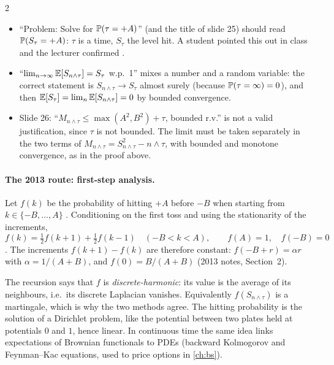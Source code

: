 \begin{paracol}{2}
\begin{coursenote}
\begin{itemize}
  \item ``Problem: Solve for $\mathbb{P}(\tau=+A)$'' (and the title of slide 25) should read $\mathbb{P}(S_\tau=+A)$: $\tau$ is a
        time, $S_\tau$ the level hit. A student pointed this out in class and the lecturer confirmed .
  \item ``$\lim_{n\to\infty}\mathbb{E}[S_{n\wedge\tau}]=S_\tau$ w.p.~1'' mixes a number and a random variable: the correct
        statement is $S_{n\wedge\tau}\to S_\tau$ almost surely (because $\mathbb{P}(\tau=\infty)=0$), and then
        $\mathbb{E}[S_\tau]=\lim_n\mathbb{E}[S_{n\wedge\tau}]=0$ by bounded convergence.
  \item Slide 26: ``$M_{n\wedge\tau}\le\max(A^2,B^2)+\tau$, bounded r.v.'' is not a valid justification, since $\tau$ is not
        bounded. The limit must be taken separately in the two terms of $M_{n\wedge\tau}=S^2_{n\wedge\tau}-n\wedge\tau$,
        with bounded and monotone convergence, as in the proof above.
\end{itemize}
\end{coursenote}

\paragraph{The 2013 route: first-step analysis.} Let $f(k)$ be the probability of hitting $+A$ before $-B$ when
starting from $k\in\{-B,\dots,A\}$ . Conditioning on the first toss and using the stationarity of
the increments,
\[
  f(k)=\tfrac12f(k+1)+\tfrac12f(k-1)\quad(-B<k<A),\qquad f(A)=1,\quad f(-B)=0
\]
. The increments $f(k+1)-f(k)$ are therefore constant: $f(-B+r)=\alpha r$ with
$\alpha=1/(A+B)$, and $f(0)=B/(A+B)$ (2013 notes, Section~2).

\begin{intuition}
The recursion says that $f$ is \emph{discrete-harmonic}: its value is the average of its neighbours, i.e.\ its discrete
Laplacian vanishes. Equivalently $f(S_{n\wedge\tau})$ is a martingale, which is why the two methods agree. The hitting
probability is the solution of a Dirichlet problem, like the potential between two plates held at potentials $0$ and
$1$, hence linear. In continuous time the same idea links expectations of Brownian functionals to PDEs (backward
Kolmogorov and Feynman--Kac equations, used to price options in \cref{ch:bs}).
\end{intuition}


\end{paracol}
